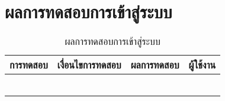 \section{ผลการทดสอบการเข้าสู่ระบบ}
\begin{table}[H]
	\caption{ผลการทดสอบการเข้าสู่ระบบ}
    \centering	
	\label{tab:test3}
    \begin{tabular}{ | p{4cm} | p{4cm} | p{4cm} | p{2cm} | }
		\hline
	\multicolumn{1}{|c|}{การทดสอบ} & \multicolumn{1}{c|}{เงื่อนไขการทดสอบ} & \multicolumn{1}{c|}{ผลการทดสอบ} & \multicolumn{1}{c|}{ผู้ใช้งาน}                             \\ \hline
	\setstretch{1.0}{ทดสอบการเข้าสู่ระบบ}
	& \setstretch{1.0}{ผู้ใช้เข้ามาในหน้าเข้าสู่ระบบ}
	& \setstretch{1.0}{ระบบแสดงหน้าเข้าสู่ระบบ} 
	&\setstretch{1.0}{\begin{flushleft}ผู้ใช้งาน\end{flushleft}} \\ \cline{2-3} 
	& \setstretch{1.0}{ผู้ใช้กดปุ่มเข้าสู่ระบบ โดยไม่กรอก username และ password } 
	& \setstretch{1.0}{ระบบแสดงข้อความบอกผู้ใช้ว่า  กรุณากรอกชื่อผู้ใช้หรือรหัสผ่านให้ถูกต้อง } 
	&\setstretch{1.0}{}\\ \cline{2-3} 
	& \setstretch{1.0}{ผู้ใช้กดเข้าสู่ระบบโดยกรอก username ไม่ถูกต้อง}  
	& \setstretch{1.0}{ระบบแสดงข้อความบอกผู้ใช้ว่า  กรุณากรอกชื่อผู้ใช้หรือรหัสผ่านให้ถูกต้อง } 
	&\setstretch{1.0}{}\\ \cline{2-3} 
	& \setstretch{1.0}{ผู้ใช้กดเข้าสู่ระบบโดยกรอก username ถูกต้องแต่กรอก password ไม่ถูกต้อง} 
	& \setstretch{1.0}{ระบบแสดงข้อความบอกผู้ใช้ว่า  กรุณากรอกชื่อผู้ใช้หรือรหัสผ่านให้ถูกต้อง } 
	&\setstretch{1.0}{}\\ \cline{2-3}
	& \setstretch{1.0}{ผู้ใช้กดเข้าสู่ระบบโดยกรอก username และ password ถูกต้องและมีชื่อเล่น รูปประจำตัว อายุ เบอร์โทรศัพท์} 
	& \setstretch{1.0}{ระบบแสดงข้อความบอกผู้ใช้ว่า  เข้าสู่ระบบสำเร็จ  และจะแสดงชื่อผู้ใช้และรูปโปรไฟล์ที่แถบบนด้านขวา} 
	&\setstretch{1.0}{}\\ \cline{2-3}
	& \setstretch{1.0}{ผู้ใช้กดเข้าสู่ระบบโดยกรอก username และ password ถูกต้องและไม่มีมีชื่อเล่น รูปประจำตัว อายุ เบอร์โทรศัพท์} 
	& \setstretch{1.0}{ระบบแสดงข้อความบอกผู้ใช้ว่า  เข้าสู่ระบบสำเร็จ  และแสดงหน้าให้เพิ่มรูปประจำตัว} 
	&\setstretch{1.0}{}\\ \cline{2-3}\hline
    \end{tabular}
\end{table}


